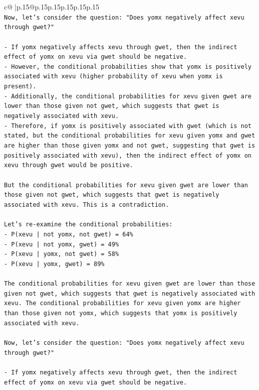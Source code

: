 \documentclass{article}
\begin{document}
{\begin{supertabular}{c@{$\;$}|p{.15\linewidth}@{}p{.15\linewidth}p{.15\linewidth}p{.15\linewidth}p{.15\linewidth}p{.15\linewidth}}
{{{\\ 
\texttt{Now, let's consider the question: "Does yomx negatively affect xevu through gwet?"} \\
\\ 
\texttt{{-}   If yomx negatively affects xevu through gwet, then the indirect effect of yomx on xevu via gwet should be negative.} \\
\texttt{{-}   However, the conditional probabilities show that yomx is positively associated with xevu (higher probability of xevu when yomx is present).} \\
\texttt{{-}   Additionally, the conditional probabilities for xevu given gwet are lower than those given not gwet, which suggests that gwet is negatively associated with xevu.} \\
\texttt{{-}   Therefore, if yomx is positively associated with gwet (which is not stated, but the conditional probabilities for xevu given yomx and gwet are higher than those given yomx and not gwet, suggesting that gwet is positively associated with xevu), then the indirect effect of yomx on xevu through gwet would be positive.} \\
\\ 
\texttt{But the conditional probabilities for xevu given gwet are lower than those given not gwet, which suggests that gwet is negatively associated with xevu. This is a contradiction.} \\
\\ 
\texttt{Let's re{-}examine the conditional probabilities:} \\
\texttt{{-}   P(xevu | not yomx, not gwet) = 64\%} \\
\texttt{{-}   P(xevu | not yomx, gwet) = 49\%} \\
\texttt{{-}   P(xevu | yomx, not gwet) = 58\%} \\
\texttt{{-}   P(xevu | yomx, gwet) = 89\%} \\
\\ 
\texttt{The conditional probabilities for xevu given gwet are lower than those given not gwet, which suggests that gwet is negatively associated with xevu. The conditional probabilities for xevu given yomx are higher than those given not yomx, which suggests that yomx is positively associated with xevu.} \\
\\ 
\texttt{Now, let's consider the question: "Does yomx negatively affect xevu through gwet?"} \\
\\ 
\texttt{{-}   If yomx negatively affects xevu through gwet, then the indirect effect of yomx on xevu via gwet should be negative.} \\
}}}
\end{supertabular}}
\end{document}
